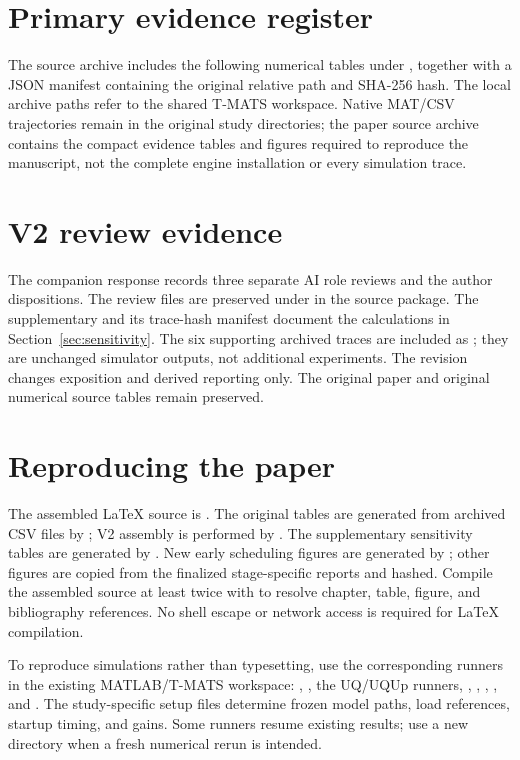 \section{Primary evidence register}
The source archive includes the following numerical tables under , together with a JSON manifest containing the original relative path and SHA-256 hash. The local archive paths refer to the shared T-MATS workspace. Native MAT/CSV trajectories remain in the original study directories; the paper source archive contains the compact evidence tables and figures required to reproduce the manuscript, not the complete engine installation or every simulation trace.


\section{V2 review evidence}
The companion response records three separate AI role reviews and the author dispositions. The review files are preserved under  in the source package. The supplementary  and its trace-hash manifest document the calculations in Section~\ref{sec:sensitivity}. The six supporting archived traces are included as ; they are unchanged simulator outputs, not additional experiments. The revision changes exposition and derived reporting only. The original paper and original numerical source tables remain preserved.

\section{Reproducing the paper}
The assembled LaTeX source is . The original tables are generated from archived CSV files by ; V2 assembly is performed by . The supplementary sensitivity tables are generated by . New early scheduling figures are generated by ; other figures are copied from the finalized stage-specific reports and hashed. Compile the assembled source at least twice with  to resolve chapter, table, figure, and bibliography references. No shell escape or network access is required for LaTeX compilation.

To reproduce simulations rather than typesetting, use the corresponding runners in the existing MATLAB/T-MATS workspace: , , the UQ/UQUp runners, , , , , and . The study-specific setup files determine frozen model paths, load references, startup timing, and gains. Some runners resume existing results; use a new directory when a fresh numerical rerun is intended.

